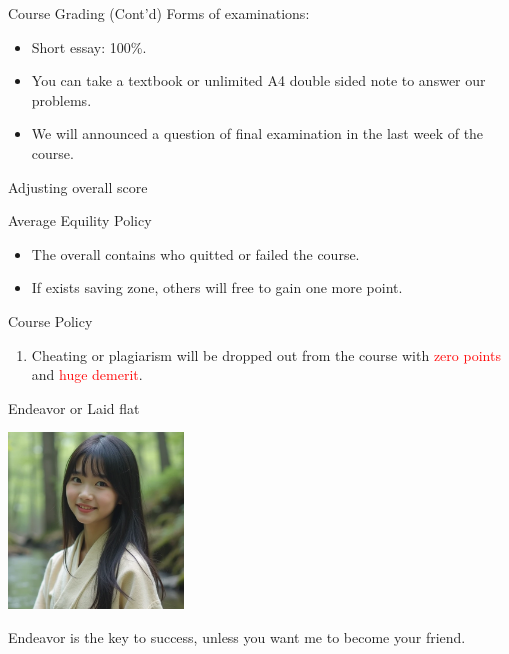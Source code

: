 \documentclass{beamer}
\begin{document}
\begin{frame}{Course Grading (Cont'd)}
Forms of examinations:
\begin{itemize}
\item Short essay: 100\%.
\item You can take a textbook or unlimited A4 double sided note to answer our problems.
\item We will announced a question of final examination in the last week of the course.
\end{itemize}
\end{frame}
\begin{frame}{Adjusting overall score}
\begin{block}{Average Equility Policy}
\begin{itemize}
\item The overall contains who quitted or failed the course.
\item If exists saving zone, others will free to gain one more point.
\end{itemize}
\end{block}
\end{frame}
\begin{frame}{Course Policy}
\begin{enumerate}
\item Cheating or plagiarism will be dropped out from the course with \textcolor{red}{zero points} and \textcolor{red}{huge demerit}. \\
\end{enumerate}
\end{frame}
\begin{frame}{Endeavor or Laid flat}
\begin{center}
\includegraphics[width=0.35\textwidth]{fail.png}
\end{center}
\begin{center}
Endeavor is the key to success, unless you want me to become your friend.
\end{center}
\end{frame}
\end{document}
